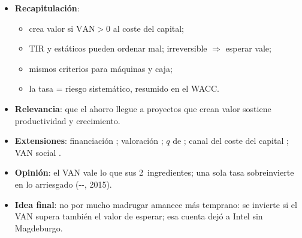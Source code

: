 \documentclass{article}
\begin{document}
\begin{columnas}
\begin{itemize}
\item \textbf{Recapitulación}:
  \begin{itemize}
  \item crea valor si $\mathrm{VAN}>0$ al coste del capital;
  \item TIR y estáticos pueden ordenar mal; irreversible $\Rightarrow$ esperar vale;
  \item mismos criterios para máquinas y caja;
  \item la tasa = riesgo sistemático, resumido en el WACC.
  \end{itemize}
\item \textbf{Relevancia}: que el ahorro llegue a proyectos que crean valor sostiene productividad y crecimiento.
\item \textbf{Extensiones}: financiación ; valoración ; $q$ de  ; canal del coste del capital ; VAN social .
\item \textbf{Opinión}: el VAN vale lo que sus 2~ingredientes; una sola tasa sobreinvierte en lo arriesgado (--, 2015).
\item \textbf{Idea final}: no por mucho madrugar amanece más temprano: se invierte si el VAN supera también el valor de esperar; esa cuenta dejó a Intel sin Magdeburgo.
\end{itemize}


\end{columnas}
\end{document}
